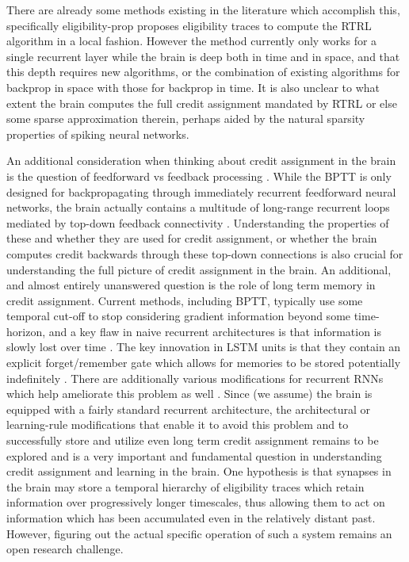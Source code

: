 There are already some methods existing in the literature which accomplish this, specifically eligibility-prop \citep{bellec2020solution} proposes eligibility traces to compute the RTRL algorithm in a local fashion. However the method currently only works for a single recurrent layer while the brain is deep both in time and in space, and that this depth requires new algorithms, or the combination of existing algorithms for backprop in space with those for backprop in time. It is also unclear to what extent the brain computes the full credit assignment mandated by RTRL or else some sparse approximation therein, perhaps aided by the natural sparsity properties of spiking neural networks. 

An additional consideration when thinking about credit assignment in the brain is the question of feedforward vs feedback processing \citep{kriegeskorte2015deep}. While the BPTT is only designed for backpropagating through immediately recurrent feedforward neural networks, the brain actually contains a multitude of long-range recurrent loops mediated by top-down feedback connectivity \citep{felleman1991distributed,grill2004human}. Understanding the properties of these and whether they are used for credit assignment, or whether the brain computes credit backwards through these top-down connections is also crucial for understanding the full picture of credit assignment in the brain. An additional, and almost entirely unanswered question is the role of long term memory in credit assignment. Current methods, including BPTT, typically use some temporal cut-off to stop considering gradient information beyond some time-horizon, and a key flaw in naive recurrent architectures is that information is slowly lost over time \citep{ollivier2015training,hochreiter1997long}. The key innovation in LSTM units is that they contain an explicit forget/remember gate which allows for memories to be stored potentially indefinitely \citep{hochreiter1997long}. There are additionally various modifications for recurrent RNNs which help ameliorate this problem as well \citep{ollivier2015training}. Since (we assume) the brain is equipped with a fairly standard recurrent architecture, the architectural or learning-rule modifications that enable it to avoid this problem and to successfully store and utilize even long term credit assignment remains to be explored and is a very important and fundamental question in understanding credit assignment and learning in the brain. One hypothesis is that synapses in the brain may store a temporal hierarchy of eligibility traces which retain information over progressively longer timescales, thus allowing them to act on information which has been accumulated even in the relatively distant past. However, figuring out the actual specific operation of such a system remains an open research challenge.


